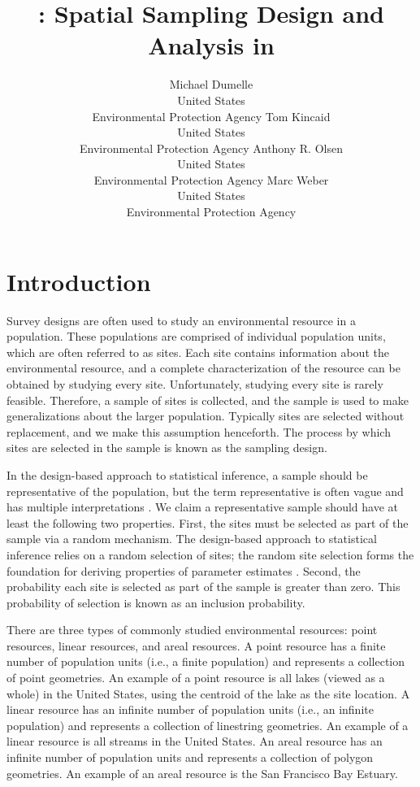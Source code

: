 \documentclass[
  shortnames]{jss}
\author{
Michael Dumelle\\United States\\
Environmental Protection Agency \And Tom Kincaid\\United States\\
Environmental Protection Agency \AND Anthony R. Olsen\\United
States\\
Environmental Protection Agency \And Marc Weber\\United States\\
Environmental Protection Agency
}
\title{\pkg{spsurvey}: Spatial Sampling Design and Analysis in
\proglang{R}}
\begin{document}
\linenumbers

\hypertarget{sec:introduction}{%
\section{Introduction}\label{sec:introduction}}

Survey designs are often used to study an environmental resource in a
population. These populations are comprised of individual population
units, which are often referred to as sites. Each site contains
information about the environmental resource, and a complete
characterization of the resource can be obtained by studying every site.
Unfortunately, studying every site is rarely feasible. Therefore, a
sample of sites is collected, and the sample is used to make
generalizations about the larger population. Typically sites are
selected without replacement, and we make this assumption henceforth.
The process by which sites are selected in the sample is known as the
sampling design.

In the design-based approach to statistical inference, a sample should
be representative of the population, but the term representative is
often vague and has multiple interpretations
\citep{kruskal1979representativea, kruskal1979representativeb, kruskal1979representativec}.
We claim a representative sample should have at least the following two
properties. First, the sites must be selected as part of the sample via
a random mechanism. The design-based approach to statistical inference
relies on a random selection of sites; the random site selection forms
the foundation for deriving properties of parameter estimates
\citep{sarndal2003model, lohr2009sampling}. Second, the probability each
site is selected as part of the sample is greater than zero. This
probability of selection is known as an inclusion probability.

There are three types of commonly studied environmental resources: point
resources, linear resources, and areal resources. A point resource has a
finite number of population units (i.e., a finite population) and
represents a collection of point geometries. An example of a point
resource is all lakes (viewed as a whole) in the United States, using
the centroid of the lake as the site location. A linear resource has an
infinite number of population units (i.e., an infinite population) and
represents a collection of linestring geometries. An example of a linear
resource is all streams in the United States. An areal resource has an
infinite number of population units and represents a collection of
polygon geometries. An example of an areal resource is the San Francisco
Bay Estuary.
\end{document}
